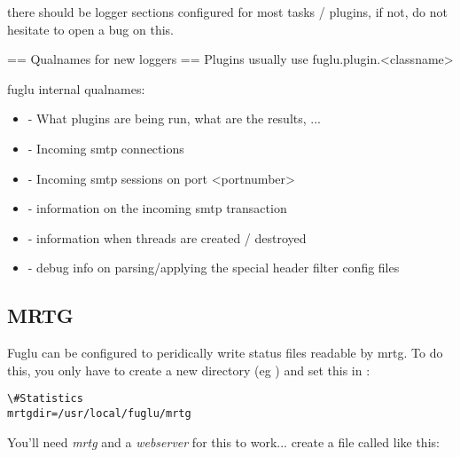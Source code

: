 \documentclass[letterpaper,10pt,english]{sphinxmanual}
\begin{document}
there should be logger sections configured for most tasks / plugins, if not, do not hesitate to open a bug on this.

== Qualnames for new loggers ==
Plugins usually use fuglu.plugin.\textless{}classname\textgreater{}

fuglu internal qualnames:
\begin{itemize}
\item {} 
 - What plugins are being run, what are the results, ...

\item {} 
 - Incoming smtp connections

\item {} 
 - Incoming smtp sessions on port \textless{}portnumber\textgreater{}

\item {} 
 - information on the incoming smtp transaction

\item {} 
 - information when threads are created / destroyed

\item {} 
 - debug info on parsing/applying the special header filter config files

\end{itemize}


\subsection{MRTG}
\label{operation-index:mrtg}
Fuglu can be configured to peridically write status files readable by mrtg. To do this, you only have to create a new directory (eg ) and set this in :

\begin{Verbatim}[commandchars=\\\{\}]
\#Statistics
mrtgdir=/usr/local/fuglu/mrtg
\end{Verbatim}

You'll need \emph{mrtg} and a \emph{webserver} for this to work... create a file called   like this:
\end{document}
